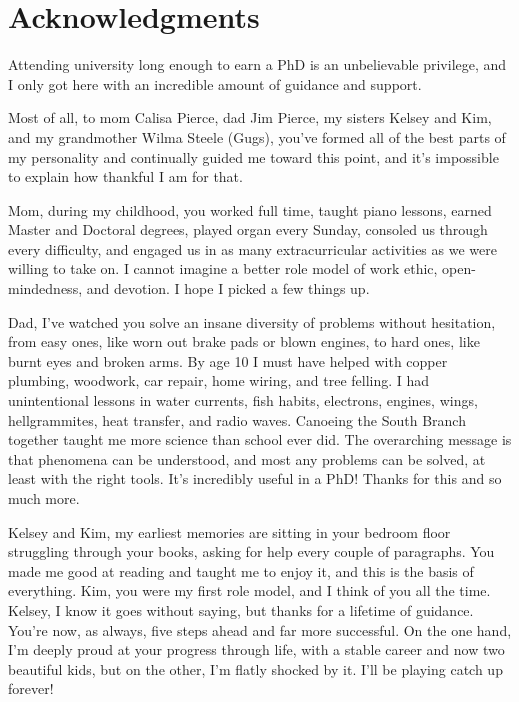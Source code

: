 
\chapter{Acknowledgments}

Attending university long enough to earn a PhD is an unbelievable privilege, and I only got here with an incredible amount of guidance and support.

Most of all, to mom Calisa Pierce, dad Jim Pierce, my sisters Kelsey and Kim, and my grandmother Wilma Steele (Gugs), you've formed all of the best parts of my personality and continually guided me toward this point, and it's impossible to explain how thankful I am for that.

Mom, during my childhood, you worked full time, taught piano lessons, earned Master and Doctoral degrees, played organ every Sunday, consoled us through every difficulty, and engaged us in as many extracurricular activities as we were willing to take on.
I cannot imagine a better role model of work ethic, open-mindedness, and devotion. I hope I picked a few things up. 

Dad, I've watched you solve an insane diversity of problems without hesitation, from easy ones, like worn out brake pads or blown engines, to hard ones, like burnt eyes and broken arms.
By age 10 I must have helped with copper plumbing, woodwork, car repair, home wiring, and tree felling.
I had unintentional lessons in water currents, fish habits, electrons, engines, wings, hellgrammites, heat transfer, and radio waves. Canoeing the South Branch together taught me more science than school ever did. The overarching message is that phenomena can be understood, and most any problems can be solved, at least with the right tools. It's incredibly useful in a PhD! Thanks for this and so much more.

Kelsey and Kim, my earliest memories are sitting in your bedroom floor struggling through your books, asking for help every couple of paragraphs. You made me good at reading and taught me to enjoy it, and this is the basis of everything. Kim, you were my first role model, and I think of you all the time. Kelsey, I know it goes without saying, but thanks for a lifetime of guidance. You're now, as always, five steps ahead and far more successful. On the one hand, I'm deeply proud at your progress through life, with a stable career and now two beautiful kids, but on the other, I'm flatly shocked by it. 
I'll be playing catch up forever!

